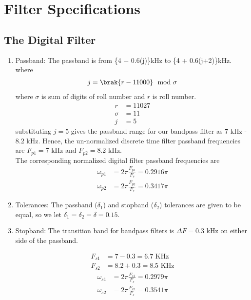 \documentclass{article}
\begin{document}
\section{Filter Specifications}
\subsection{The Digital Filter}
\begin{enumerate}
\item {Passband:}
The passband is from \{4 + 0.6(j)\}kHz to \{4 + 0.6(j+2)\}kHz. \\
where 
\begin{align}
    j=\brak{r-11000} \mod \sigma
\end{align}
where $\sigma$ is sum of digits of roll number and $r$ is roll number.\\
\begin{align}
    r&=11027\\
    \sigma  &= 11\\
    j&=5
\end{align}
 substituting $j =5$ gives the passband
range for our bandpass filter as $7$ kHz - $8.2$ kHz.  Hence, the un-normalized discrete time filter
passband frequencies are $F_{p1} = 7$ kHz
and $F_{p2} = 8.2$ kHz. \\
The corresponding normalized digital filter passband frequencies are
\begin{align}
    \omega_{p1} &= 2\pi\frac{F_{p1}}{F_s} = 0.2916 \pi\\
    \omega_{p2} &= 2\pi\frac{F_{p2}}{F_s} = 0.3417\pi
\end{align}

\item {Tolerances:}  The passband ($\delta_1$) and stopband ($\delta_2$) tolerances are given to
be equal, so we let $\delta_1 = \delta_2 = \delta = 0.15$.

\item { Stopband:}  The {transition band} for bandpass filters is $\Delta F = 0.3$ kHz on either side of the passband.

\begin{align}
    F_{s1} &= 7-0.3 = 6.7 \text{ KHz}\\
    F_{s2} &= 8.2+0.3 = 8.5  \text{ KHz}
\end{align}
\begin{align}
    \omega_{s1} &= 2\pi\frac{F_{s1}}{F_s} = 0.2979\pi\\
     \omega_{s2} &= 2\pi\frac{F_{s2}}{F_s} = 0.3541\pi\\
\end{align}
\end{enumerate}
\end{document}
